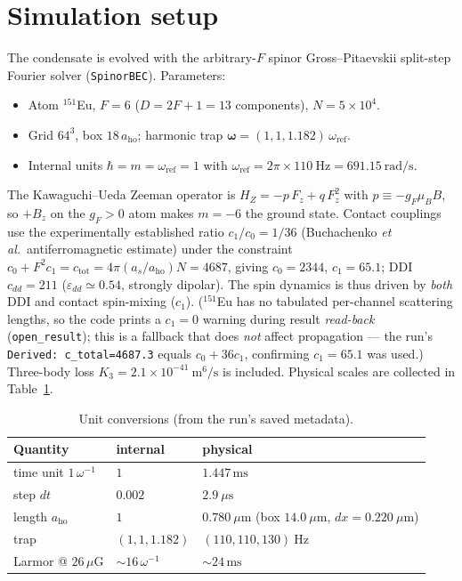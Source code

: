 \documentclass[11pt]{article}
\newcommand{\uG}{\,\mu\mathrm{G}}
\newcommand{\ms}{\,\mathrm{ms}}
\newcommand{\wref}{\omega^{-1}}
\begin{document}
\section{Simulation setup}
The condensate is evolved with the arbitrary-$F$ spinor Gross--Pitaevskii
split-step Fourier solver (\texttt{SpinorBEC}). Parameters:
\begin{itemize}\itemsep2pt
  \item Atom $^{151}$Eu, $F{=}6$ ($D{=}2F{+}1=13$ components), $N=5\times10^{4}$.
  \item Grid $64^3$, box $18\,a_{\mathrm{ho}}$; harmonic trap
        $\boldsymbol\omega=(1,1,1.182)\,\omega_{\mathrm{ref}}$.
  \item Internal units $\hbar=m=\omega_{\mathrm{ref}}=1$ with
        $\omega_{\mathrm{ref}}=2\pi\times110\ \mathrm{Hz}=691.15\ \mathrm{rad/s}$.
\end{itemize}
The Kawaguchi--Ueda Zeeman operator is $H_Z=-p\,F_z+q\,F_z^{2}$ with
$p\equiv-g_F\mu_B B$, so $+B_z$ on the $g_F>0$ atom makes $m{=}{-}6$ the ground state.
Contact couplings use the experimentally established ratio $c_1/c_0=1/36$
(Buchachenko \emph{et al.}\ antiferromagnetic estimate) under the constraint
$c_0+F^2c_1=c_{\mathrm{tot}}=4\pi(a_s/a_{\mathrm{ho}})N=4687$, giving $c_0=2344$,
$c_1=65.1$; DDI $c_{dd}=211$ ($\varepsilon_{dd}\simeq0.54$, strongly dipolar). The spin
dynamics is thus driven by \emph{both} DDI and contact spin-mixing ($c_1$). ($^{151}$Eu
has no tabulated per-channel scattering lengths, so the code prints a $c_1{=}0$ warning
during result \emph{read-back} (\texttt{open\_result}); this is a fallback that does
\emph{not} affect propagation --- the run's \texttt{Derived: c\_total=4687.3} equals
$c_0+36c_1$, confirming $c_1{=}65.1$ was used.) Three-body loss
$K_3=2.1\times10^{-41}\ \mathrm{m^6/s}$ is included. Physical scales are collected in Table~\ref{tab:units}.

\begin{table}[h]\centering
\begin{tabular}{lll}
\toprule
Quantity & internal & physical\\\midrule
time unit $1\,\wref$ & $1$ & $1.447\ms$\\
step $dt$ & $0.002$ & $2.9\ \mu\mathrm{s}$\\
length $a_{\mathrm{ho}}$ & $1$ & $0.780\ \mu\mathrm{m}$ (box $14.0\ \mu\mathrm{m}$, $dx=0.220\ \mu\mathrm{m}$)\\
trap & $(1,1,1.182)$ & $(110,110,130)\ \mathrm{Hz}$\\
Larmor @ $26\uG$ & $\sim16\,\wref$ & $\sim24\ms$\\
\bottomrule
\end{tabular}
\caption{Unit conversions (from the run's saved metadata).}
\label{tab:units}
\end{table}
\end{document}
